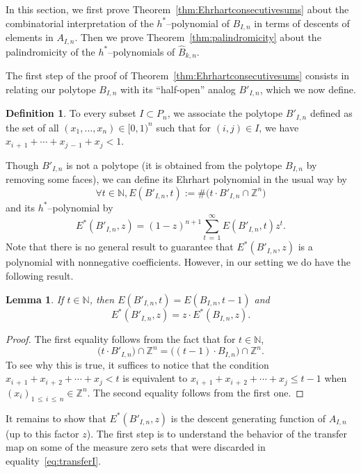 \documentclass[11pt]{article}
\newtheorem{lemm}[theo]{Lemma}
\theoremstyle{definition}
\newtheorem{defi}[theo]{Definition}
\numberwithin{equation}{section}
\numberwithin{figure}{section}
\numberwithin{table}{section}
\newcommand{\N}{\mathbb N}
\let\oldforall\forall
\renewcommand*{\forall}{\mathrel{\oldforall}}
\begin{document}
In this section, we first prove Theorem~\ref{thm:Ehrhartconsecutivesums} about the combinatorial interpretation of the $h^*$--polynomial of $B_{I,n}$ in terms of descents of elements in $A_{I,n}$. Then we prove Theorem~\ref{thm:palindromicity} about the palindromicity of the $h^*$--polynomials of $\hat{B}_{k,n}$.

The first step of the proof of Theorem~\ref{thm:Ehrhartconsecutivesums} consists in relating our polytope $B_{I,n}$ with its ``half-open'' analog $B'_{I,n}$, which we now define.

\begin{defi}
To every subset $I\subset P_n$, we associate the polytope $B'_{I,n}$ defined as the set of all $(x_1,\ldots,x_{n})\in[0,1)^n$ such that for $(i,j)\in I$, we have $x_{i\,+\,1} + \cdots + x_{j\,-\,1} + x_j< 1$.
\end{defi}
Though $B'_{I,n}$ is not a polytope (it is obtained from the polytope $B_{I,n}$ by removing some faces), we can define its Ehrhart polynomial in the usual way by
\[
\forall t\in\N, E(B'_{I,n}, t) := \# \big(t\cdot B'_{I,n} \cap \mathbb{Z}^n \big)
\]
and its $h^*$--polynomial by
\[
E^*(B'_{I,n}, z) = (1-z)^{n+1} \sum_{t\,=\,1}^{\infty} E(B'_{I,n}, t) z^t.
\]
Note that there is no general result to guarantee that $E^*(B'_{I,n}, z)$ is a polynomial with nonnegative coefficients. However, in our setting we do have the following result.

\begin{lemm}
If $t \in \N$, then $E(B'_{I,n}, t) = E(B_{I,n}, t-1)$ and
\begin{equation}\label{eq:halfopenEhrhart}
E^*(B'_{I,n}, z) = z\cdot E^*(B_{I,n}, z).
\end{equation}
\end{lemm}

\begin{proof}
The first equality follows from the fact that for $t \in\N$,
\[
\big(t \cdot B'_{I,n} \big) \cap \mathbb{Z}^n = \big((t-1) \cdot B_{I,n} \big) \cap \mathbb{Z}^n.
\]
To see why this is true, it suffices to notice that the condition $x_{i\,+\,1}+x_{i\,+\,2}+ \cdots + x_{j} < t$ is equivalent to $x_{i\,+\,1}+x_{i\,+\,2} + \cdots + x_{j} \leq t-1$ when $(x_i)_{1\,\leq\,i\,\leq\,n} \in \mathbb{Z}^n$. The second equality follows from the first one.
\end{proof}

It remains to show that $E^*(B'_{I,n}, z)$ is the descent generating function of $A_{I,n}$ (up to this factor $z$). The first step is to understand the behavior of the transfer map on some of the measure zero sets that were discarded in equality~\eqref{eq:transferI}.
\end{document}
